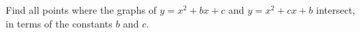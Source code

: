 Find all points where the graphs of $y=x^2+bx+c$ and $y=x^2+cx+b$ intersect, in terms of the constants $b$ and $c$.
